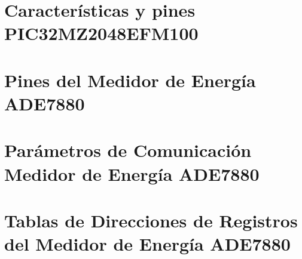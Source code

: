 \documentclass[letterpaper,12pt,oneside]{book}
\begin{document}
	\appendix
	\chapter{Características y pines PIC32MZ2048EFM100}
		

	\chapter{Pines del Medidor de Energía ADE7880}
		\label{PinesADE7880}
		

	\chapter{Parámetros de Comunicación Medidor de Energía ADE7880}
		\label{ComADE7880}
		

	\chapter{Tablas de Direcciones de Registros del Medidor de Energía ADE7880}
		\label{RegADE7880}
		

	\backmatter%
\end{document}
